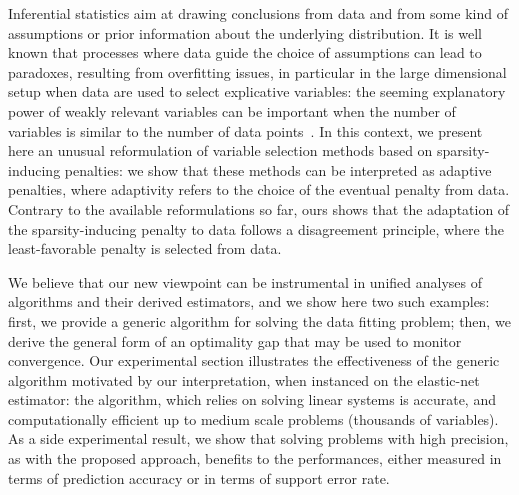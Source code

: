 Inferential statistics aim at drawing conclusions from data and from some kind
of assumptions or prior information about the underlying distribution.  It is
well known that processes where data guide the choice of assumptions can lead to
paradoxes, resulting from overfitting issues, in particular in the large
dimensional setup when data are used to select explicative variables: the
seeming explanatory power of weakly relevant variables can be important when the
number of variables is similar to the number of data
points~\citep{Freedman83b,Ambroise02}.
In this context, we present here an unusual reformulation of variable selection
methods based on sparsity-inducing penalties: we show that these methods can be
interpreted as adaptive penalties, where adaptivity refers to the choice of the
eventual penalty from data.
Contrary to the available reformulations so far, ours shows that the adaptation
of the sparsity-inducing penalty to data follows a disagreement principle, where
the least-favorable penalty is selected from data.

We believe that our new viewpoint can be instrumental in unified analyses of
algorithms and their derived estimators, and we show here two such examples:
first, we provide a generic algorithm for solving the data fitting problem;
then, we derive the general form of an optimality gap that may be used to
monitor convergence.
Our experimental section illustrates the effectiveness of the generic algorithm
motivated by our interpretation, when instanced on the elastic-net estimator:
the algorithm, which relies on solving linear systems
is accurate, and computationally efficient up to medium scale problems (thousands of
variables).
As a side experimental result, we show that solving problems with high
precision, as with the proposed approach, benefits to the performances, either
measured in terms of prediction accuracy or in terms of support error rate.




